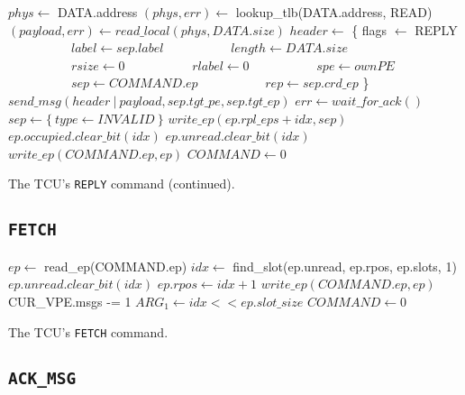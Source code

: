 \begin{algorithm}
    \setcounter{AlgoLine}{27}
    $phys \gets$ DATA.address\;
    $(phys, err) \gets$ lookup\_tlb(DATA.address, READ)\;
    \extend{}
    \BlankLine
    $(payload, err) \gets read\_local(phys, DATA.size)$\;
    \extend{}
    \BlankLine
    $header \gets$ \{ flags $\gets$ REPLY\;
    $\quad\quad\quad\quad\quad label \gets sep.label$\;
    $\quad\quad\quad\quad\quad length \gets DATA.size$\;
    $\quad\quad\quad\quad\quad rsize \gets 0$\;
    $\quad\quad\quad\quad\quad rlabel \gets 0$\;
    $\quad\quad\quad\quad\quad spe \gets ownPE$\;
    $\quad\quad\quad\quad\quad sep \gets COMMAND.ep$\;
    $\quad\quad\quad\quad\quad rep \gets sep.crd\_ep$ \}\;
    $send\_msg(header\ |\ payload, sep.tgt\_pe, sep.tgt\_ep)$\;
    $err \gets wait\_for\_ack()$\;
    \BlankLine
    $sep \gets \{~type \gets INVALID~\}$\;
    $write\_ep(ep.rpl\_eps + idx, sep)$\;
    \BlankLine
    \extend{}
    \BlankLine
    $ep.occupied.clear\_bit(idx)$\;
    $ep.unread.clear\_bit(idx)$\;
    $write\_ep(COMMAND.ep, ep)$\;
    \BlankLine
    $COMMAND \gets 0$\;
    \caption{The TCU's \texttt{REPLY} command (continued).}
\end{algorithm}

\subsection{\texttt{FETCH}}

\begin{algorithm}[H]
    $ep \gets$ read\_ep(COMMAND.ep)\;
    \extend{}
    \BlankLine
    $idx \gets$ find\_slot(ep.unread, ep.rpos, ep.slots, 1)\;
    $ep.unread.clear\_bit(idx)$\;
    $ep.rpos \gets idx + 1$\;
    $write\_ep(COMMAND.ep, ep)$\;
    \BlankLine
    CUR\_VPE.msgs -= 1\;
    \extend{}
    \BlankLine
    $ARG_1 \gets idx << ep.slot\_size$\;
    $COMMAND \gets 0$\;
    \caption{The TCU's \texttt{FETCH} command.}
\end{algorithm}

\subsection{\texttt{ACK\_MSG}}

